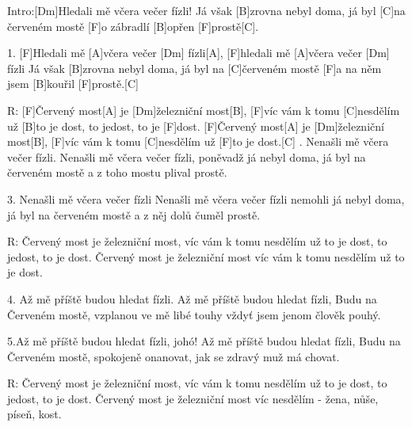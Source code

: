 
Intro:[Dm]Hledali mě včera večer fízli!
Já však [B]zrovna nebyl doma, 
já byl [C]na červeném mostě
[F]o zábradlí [B]opřen [F]prostě[C].

1. [F]Hledali mě [A]včera večer [Dm] fízli[A],
[F]hledali mě [A]včera večer [Dm] fízli
Já však [B]zrovna nebyl doma, 
já byl na [C]\null červeném mostě
[F]a na něm jsem [B]kouřil [F]prostě.[C]



R: [F]\null Červený most[A] je [Dm]\null železniční most[B],
[F]víc vám k tomu [C]nesdělím už [B]to je dost, 
to jedost, to je [F]dost.
[F]\null Červený most[A] je [Dm]\null železniční most[B],
[F]víc vám k tomu [C]nesdělím už [F]to je dost.[C]
. Nenašli mě včera večer fízli.
Nenašli mě včera večer fízli,
poněvadž já nebyl doma, 
já byl na červeném mostě
a z toho mostu plival prostě.

3. Nenašli mě včera večer fízli
Nenašli mě včera večer fízli
nemohli já nebyl doma, já byl na červeném mostě
a z něj dolů čuměl prostě.

R: Červený most je železniční most,
víc vám k tomu nesdělím už to je dost, 
to jedost, to je dost.
Červený most je železniční most
víc vám k tomu nesdělím už to je dost.

4. Až mě příště budou hledat fízli.
Až mě příště budou hledat fízli,
Budu na Červeném mostě, vzplanou ve mě libé touhy
vždyť jsem jenom člověk pouhý.

5.Až mě příště budou hledat fízli, johó!
Až mě příště budou hledat fízli,
Budu na Červeném mostě, spokojeně onanovat,
jak se zdravý muž má chovat.

R: Červený most je železniční most,
víc vám k tomu nesdělím už to je dost, 
to jedost, to je dost.
Červený most je železniční most
víc nesdělím - žena, nůše, píseň, kost.